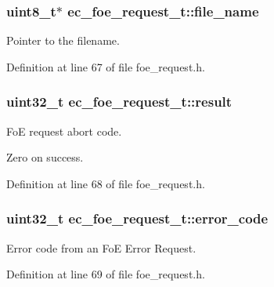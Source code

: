 \subsubsection[{file\-\_\-name}]{\setlength{\rightskip}{0pt plus 5cm}uint8\-\_\-t$\ast$ {\bf ec\-\_\-foe\-\_\-request\-\_\-t\-::file\-\_\-name}}\label{structec__foe__request__t_a9ff443ccddd8bd0492f364abb7fd4a32}


\-Pointer to the filename. 



\-Definition at line 67 of file foe\-\_\-request.\-h.

\subsubsection[{result}]{\setlength{\rightskip}{0pt plus 5cm}uint32\-\_\-t {\bf ec\-\_\-foe\-\_\-request\-\_\-t\-::result}}\label{structec__foe__request__t_a3755f2ecc7d79a09afc8d567b11b7aef}


\-Fo\-E request abort code. 

\-Zero on success. 

\-Definition at line 68 of file foe\-\_\-request.\-h.

\subsubsection[{error\-\_\-code}]{\setlength{\rightskip}{0pt plus 5cm}uint32\-\_\-t {\bf ec\-\_\-foe\-\_\-request\-\_\-t\-::error\-\_\-code}}\label{structec__foe__request__t_a61bb591aa99ad14d759e67c687b11d5d}


\-Error code from an \-Fo\-E \-Error \-Request. 



\-Definition at line 69 of file foe\-\_\-request.\-h.

